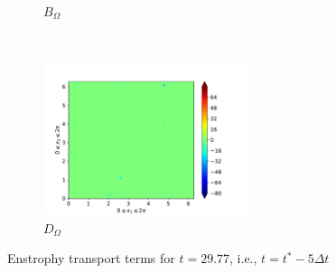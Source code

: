 \begin{figure}[H]
\begin{subfigure}{0.45\textwidth}
        \caption{$B_{\Omega}$}
    \end{subfigure}
    ~
    \begin{subfigure}{0.45\textwidth}
        \includegraphics[height=1.75in]{media/run-cds-65/D-enst-1335}
        \caption{$D_{\Omega}$}
    \end{subfigure}
    \caption{Enstrophy transport terms for $t=29.77$, i.e., $t=t^{\ast} -5 \Delta t$}
\end{figure}

\newpage

